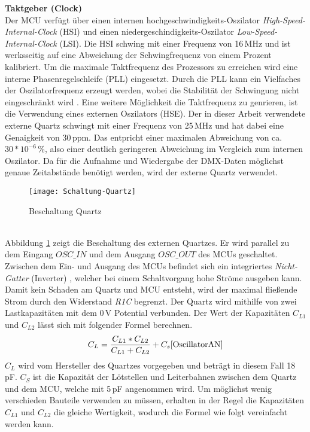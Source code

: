 \textbf{Taktgeber (Clock)}\\
Der MCU verfügt über einen internen hochgeschwindigkeits-Oszilator \textit{High-Speed-Internal-Clock} (HSI) und einen niedergeschindigkeits-Oszilator \textit{Low-Speed-Internal-Clock} (LSI). Die HSI schwing mit einer Frequenz von 16\,MHz und ist werksseitig auf eine Abweichung der Schwingfrequenz von einem Prozent kalibriert. Um die maximale Taktfrequenz des Prozessors zu erreichen wird eine interne Phasenregelschleife (PLL) eingesetzt. Durch die PLL kann ein Vielfaches der Oszilatorfrequenz erzeugt werden, wobei die Stabilität der Schwingung nicht eingeschränkt wird \cite[S. 270]{Ehrhardt1992}. Eine weitere Möglichkeit die Taktfrequenz zu genrieren, ist die Verwendung eines externen Oszilators (HSE). Der in dieser Arbeit verwendete externe Quartz schwingt mit einer Frequenz von 25\,MHz und hat dabei eine Genaigkeit von 30\,ppm. Das entpricht einer maximalen Abweichung von ca. \(30*10^{-6}\)\,\%, also einer deutlich geringeren Abweichung im Vergleich zum internen Oszilator. Da für die Aufnahme und Wiedergabe der DMX-Daten möglichst genaue Zeitabstände benötigt werden, wird der externe Quartz verwendet.
\begin{figure}[!h]
	\begin{center}
			\texttt{[image: Schaltung-Quartz]}
			\caption{Beschaltung Quartz}
			\label{fig:Quartz}
	\end{center}
\end{figure}\\
Abbildung \ref{fig:Quartz} zeigt die Beschaltung des externen Quartzes. Er wird parallel zu dem Eingang $OSC\_IN$ und dem Ausgang $OSC\_OUT$ des MCUs geschaltet. Zwischen dem Ein- und Ausgang des MCUs befindet sich ein integriertes \textit{Nicht-Gatter} (Inverter) \cite[S. 11]{OscillatorAN}, welcher bei einem Schaltvorgang hohe Ströme ausgeben kann. Damit kein Schaden am Quartz und MCU entsteht, wird der maximal fließende Strom durch den Widerstand \textit{R1C} begrenzt. Der Quartz wird mithilfe von zwei Lastkapazitäten mit dem 0\,V Potential verbunden. Der Wert der Kapazitäten \textit{$C_{L1}$} und \textit{$C_{L2}$} lässt sich mit folgender Formel berechnen.
\begin{equation}
		C_L = \frac{C_{L1} * C_{L2}} {C_{L1} + C_{L2}} + C_s \cite[S. 12]{OscillatorAN}
\end{equation}
\textit{$C_L$} wird vom Hersteller des Quartzes vorgegeben und beträgt in diesem Fall 18\,pF. \textit{$C_S$} ist die Kapazität der Lötstellen und Leiterbahnen zwischen dem Quartz und dem MCU, welche mit 5\,pF angenommen wird. Um möglichst wenig verschieden Bauteile verwenden zu müssen, erhalten in der Regel die Kapazitäten $C_{L1}$ und $C_{L2}$ die gleiche Wertigkeit, wodurch die Formel wie folgt vereinfacht werden kann.

